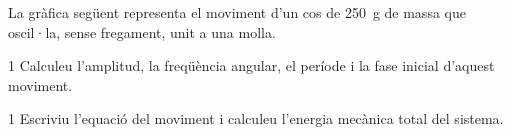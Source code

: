 La gràfica següent representa el moviment d'un cos de 250~g de massa que oscil·la, sense fregament, unit a una molla.


\begin{apartat}{1}
Calculeu l'amplitud, la freqüència angular, el període i la fase inicial d'aquest moviment.
\end{apartat}

\begin{apartat}{1}
Escriviu l'equació del moviment i calculeu l'energia mecànica total del sistema.
\end{apartat}
